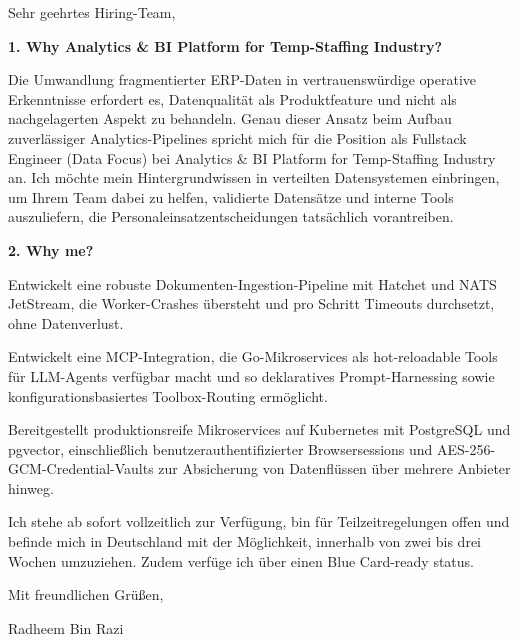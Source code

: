 \documentclass[11pt,a4paper]{coverletter}
\begin{document}
\opening{Sehr geehrtes Hiring-Team,}

\vspace{8pt}\noindent\textbf{1. Why Analytics \& BI Platform for Temp-Staffing Industry?}\par\vspace{3pt}

Die Umwandlung fragmentierter ERP-Daten in vertrauenswürdige operative Erkenntnisse erfordert es, Datenqualität als Produktfeature und nicht als nachgelagerten Aspekt zu behandeln. Genau dieser Ansatz beim Aufbau zuverlässiger Analytics-Pipelines spricht mich für die Position als Fullstack Engineer (Data Focus) bei Analytics \& BI Platform for Temp-Staffing Industry an. Ich möchte mein Hintergrundwissen in verteilten Datensystemen einbringen, um Ihrem Team dabei zu helfen, validierte Datensätze und interne Tools auszuliefern, die Personaleinsatzentscheidungen tatsächlich vorantreiben.

\vspace{8pt}\noindent\textbf{2. Why me?}\par\vspace{3pt}

\bullets

  \item Entwickelt eine robuste Dokumenten-Ingestion-Pipeline mit Hatchet und NATS JetStream, die Worker-Crashes übersteht und pro Schritt Timeouts durchsetzt, ohne Datenverlust.

  \item Entwickelt eine MCP-Integration, die Go-Mikroservices als hot-reloadable Tools für LLM-Agents verfügbar macht und so deklaratives Prompt-Harnessing sowie konfigurationsbasiertes Toolbox-Routing ermöglicht.

  \item Bereitgestellt produktionsreife Mikroservices auf Kubernetes mit PostgreSQL und pgvector, einschließlich benutzerauthentifizierter Browsersessions und AES-256-GCM-Credential-Vaults zur Absicherung von Datenflüssen über mehrere Anbieter hinweg.

\bulletsend

Ich stehe ab sofort vollzeitlich zur Verfügung, bin für Teilzeitregelungen offen und befinde mich in Deutschland mit der Möglichkeit, innerhalb von zwei bis drei Wochen umzuziehen. Zudem verfüge ich über einen Blue Card-ready status.

\closing{Mit freundlichen Grüßen,}{Radheem Bin Razi}
\end{document}
